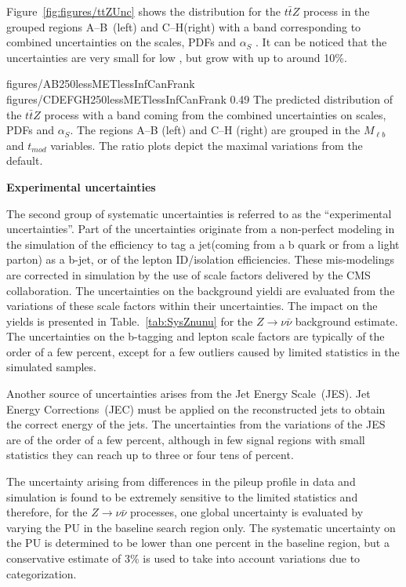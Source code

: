 Figure~\ref{fig:figures/ttZUnc} shows the  \MET distribution for the $t\bar{t}Z$ process in the grouped regions A--B~(left) and C--H(right) with a band corresponding to combined uncertainties on the scales, PDFs and $\alpha_{S}$ . It can be noticed that the uncertainties are very small for low \MET, but grow with \MET up to around 10\%.

                 {figures/AB250lessMETlessInfCanFrank} %
                 {figures/CDEFGH250lessMETlessInfCanFrank} %
                 {0.49}       %
                 { The predicted \MET distribution of the $t\bar{t}Z$ process with a band coming from the combined uncertainties on scales, PDFs and $\alpha_{S}$. The regions A--B (left) and C--H (right) are grouped in the $M_{\ell b}$ and $t_{mod}$ variables. The ratio plots depict the maximal variations from the default. }

\textbf{Experimental uncertainties}

The second group of systematic uncertainties is referred to as the ``experimental uncertainties''. Part of the uncertainties originate from a non-perfect modeling in the simulation of the efficiency to tag a jet(coming from a b quark or from a light parton) as a b-jet, or of the lepton ID/isolation efficiencies. These mis-modelings are corrected in simulation by the use of scale factors delivered by the CMS collaboration.  The uncertainties on the background yieldi are evaluated from the variations of these scale factors within their uncertainties. The impact on the yields is presented in Table.~\ref{tab:SysZnunu} for the $Z \to \nu \bar{\nu}$ background estimate. The uncertainties on the b-tagging and lepton scale factors are typically of the order of a few percent, except for a few outliers caused by limited statistics in the simulated samples.

Another source of uncertainties arises from the Jet Energy Scale~(JES). Jet Energy Corrections~(JEC) must be applied on the reconstructed jets to obtain the correct energy of the jets. The uncertainties from the variations of the JES are of the order of a few percent, although in few signal regions with small statistics they can reach up to three or four tens of percent. 

The uncertainty arising from differences in the pileup profile in data and simulation is found to be extremely sensitive to the limited statistics and therefore, for the $Z \to  \nu \bar{\nu}$ processes, one global uncertainty is evaluated by varying the PU in the baseline search region only. The systematic uncertainty on the PU is determined to be lower than one percent in the baseline region, but a conservative estimate of 3\% is used to take into account variations due to categorization. 

